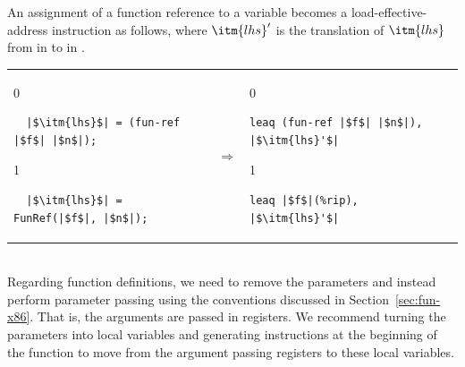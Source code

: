 \documentclass[7x10,nocrop]{TimesAPriori_MIT}%
\def\racketEd{0}
\def\pythonEd{1}
\def\edition{0}
\begin{document}
An assignment of a function reference to a variable becomes a
load-effective-address instruction as follows, where $\itm{lhs}'$
is the translation of $\itm{lhs}$ from \Atm{} in \LangCFun{}
to \Arg{} in \LangXIndCallVar{}. \\
\begin{tabular}{lcl}
\begin{minipage}{0.35\textwidth}
{\if\edition\racketEd
\begin{lstlisting}
  |$\itm{lhs}$| = (fun-ref |$f$| |$n$|);
\end{lstlisting}
\fi}
{\if\edition\pythonEd
\begin{lstlisting}
  |$\itm{lhs}$| = FunRef(|$f$|, |$n$|);
\end{lstlisting}
\fi}
\end{minipage}
&
$\Rightarrow$\qquad\qquad
&
\begin{minipage}{0.3\textwidth}
{\if\edition\racketEd
\begin{lstlisting}
leaq (fun-ref |$f$| |$n$|), |$\itm{lhs}'$|
\end{lstlisting}
\fi}
{\if\edition\pythonEd
\begin{lstlisting}
leaq |$f$|(%rip), |$\itm{lhs}'$|
\end{lstlisting}
\fi}
\end{minipage}
\end{tabular} \\

Regarding function definitions, we need to remove the parameters and
instead perform parameter passing using the conventions discussed in
Section~\ref{sec:fun-x86}. That is, the arguments are passed in
registers. We recommend turning the parameters into local variables
and generating instructions at the beginning of the function to move
from the argument passing registers to these local variables.
\end{document}
